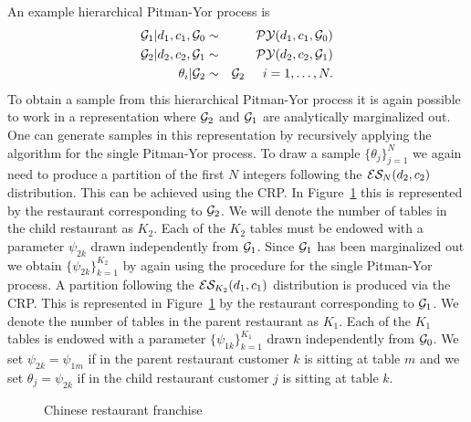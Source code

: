 An example hierarchical Pitman-Yor process is 
%
\begin{eqnarray*}
\G_1|d_1, c_1, \G_0 &\sim& \PY(d_1,c_1,\G_0)\\
\G_2 | d_2, c_2, \G_1 &\sim& \PY(d_2,c_2, \G_1)\\
\theta_i | \G_2 &\sim& \G_2 \hspace{.5cm} i = 1,\dots, N.
\end{eqnarray*}
%
To obtain a sample from this hierarchical Pitman-Yor process it is again possible to work in a representation where $\G_2$ and $\G_1$ are analytically marginalized out. One can generate samples in this representation by recursively applying the algorithm for the single Pitman-Yor process.  To draw a sample $\{ \theta_j \}_{j = 1}^N$ we again need to produce a partition of the first $N$ integers following the $\ES_N(d_2,c_2)$ distribution.  This can be achieved using the CRP.  In Figure~\ref{figHPY} this is represented by the restaurant corresponding to $\G_2$. We will denote the number of tables in the child restaurant as $K_2$.  Each of the $K_2$ tables must be endowed with a parameter $ \psi_{2k}$ drawn independently from $\G_1$.  Since $\G_1$ has been marginalized out we obtain $\{ \psi_{2k} \}_ {k = 1}^{K_2}$ by again using the procedure for the single Pitman-Yor process.  A partition following the $\ES_{K_2}(d_1,c_1)$ distribution is produced via the CRP.  This is represented in Figure~\ref{figHPY} by the restaurant corresponding to $\G_1$. We denote the number of tables in the parent restaurant as $K_1$.   Each of the $K_1$ tables is endowed with a parameter $\{ \psi_{1k} \}_{ k = 1}^{K_1}$ drawn independently from $\G_0$.  We set $\psi_{2k}  = \psi_{1m}$ if in the parent restaurant customer $k$ is sitting at table $m$ and we set $\theta_j = \psi_{2k}$ if in the child restaurant customer $j$ is sitting at table $k$.
%
\begin{figure}[t] 
	\begin{center}
		\caption{Chinese restaurant franchise}
		\label{figHPY}
	\end{center} 
\end{figure} 
